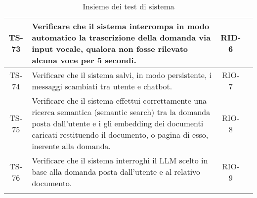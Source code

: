 \begin{xltabular}{\textwidth}{| c | X | c | c |}
    \hline
    TS-73 & Verificare che il sistema interrompa in modo automatico la trascrizione della domanda via input vocale, qualora non fosse rilevato alcuna voce per 5 secondi. & RID-6 & \textcolor{xmarkcolor}{} \\
    \hline
    TS-74 & Verificare che il sistema salvi, in modo persistente, i messaggi scambiati tra utente e chatbot. & RIO-7 & \textcolor{xmarkcolor}{} \\
    \hline
    TS-75 & Verificare che il sistema effettui correttamente una ricerca semantica (semantic search) tra la domanda posta dall'utente e i gli embedding dei documenti caricati restituendo il documento, o pagina di esso, inerente alla domanda. & RIO-8 & \textcolor{xmarkcolor}{} \\
    \hline
    TS-76 & Verificare che il sistema interroghi il LLM scelto in base alla domanda posta dall'utente e al relativo documento. & RIO-9 & \textcolor{xmarkcolor}{} \\
    \hline
     \caption{Insieme dei test di sistema}
    \label{tab:test}
\end{xltabular}
\endgroup
